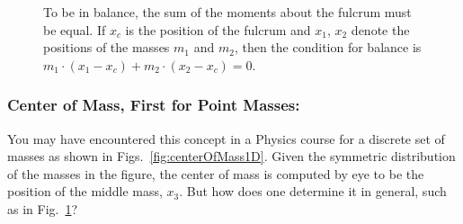 \begin{figure}
    \centering


    \caption{To be in balance, the sum of the moments about the fulcrum must be equal. If $x_c$ is the position of the fulcrum and $x_1$, $x_2$ denote the positions of the masses $m_1$ and $m_2$, then the condition for balance is $m_1 \cdot (x_1-x_c) + m_2 \cdot (x_2-x_c) = 0$.}
    \label{fig:FulcrumRepresentationCoM}
\end{figure}







\subsubsection{Center of Mass, First for Point Masses:} You may have encountered this concept in a Physics course for a discrete set of masses as shown in Figs.~\ref{fig:centerOfMass1D}. Given the symmetric distribution of the masses in the figure, the center of mass is computed by eye to be the position of the middle mass, $x_3$. But how does one determine it in general, such as in Fig.~\ref{fig:FulcrumRepresentationCoM}? 

